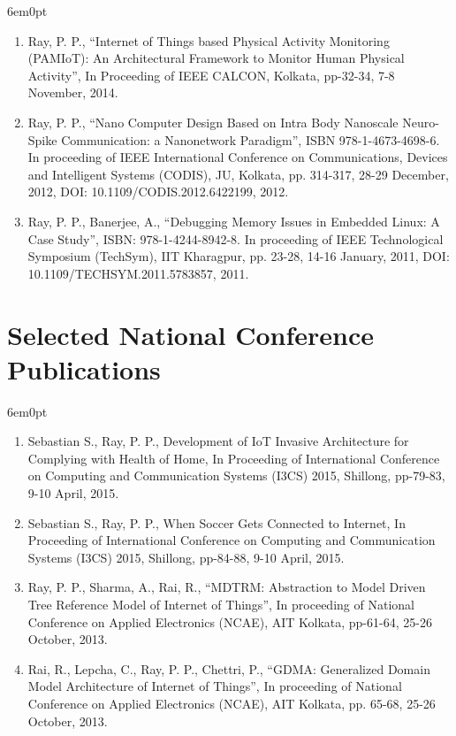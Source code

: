 \documentclass[11pt,a4paper]{moderncv}
\begin{document}
\begin{adjustwidth}{6em}{0pt}
\begin{enumerate}
	\item Ray, P. P., “Internet of Things based Physical Activity Monitoring (PAMIoT): An Architectural Framework to Monitor Human Physical Activity”, In Proceeding of IEEE CALCON, Kolkata, pp-32-34, 7-8 November, 2014.
	
	\item Ray, P. P., “Nano Computer Design Based on Intra Body Nanoscale Neuro-Spike Communication: a Nanonetwork Paradigm”, ISBN 978-1-4673-4698-6. In proceeding of IEEE International Conference on Communications, Devices and Intelligent Systems (CODIS), JU, Kolkata, pp. 314-317, 28-29 December, 2012, DOI: 10.1109/CODIS.2012.6422199, 2012.
	
	\item Ray, P. P., Banerjee, A., “Debugging Memory Issues in Embedded Linux: A Case Study”, ISBN: 978-1-4244-8942-8. In proceeding of IEEE Technological Symposium (TechSym), IIT Kharagpur, pp. 23-28, 14-16 January, 2011, DOI: 10.1109/TECHSYM.2011.5783857, 2011.
	

	\end{enumerate}
\end{adjustwidth}




\section{\textbf{Selected National Conference Publications}}

\begin{adjustwidth}{6em}{0pt}
	\begin{enumerate}
		
		\item Sebastian S., Ray, P. P., Development of IoT Invasive Architecture for Complying with Health of Home, In Proceeding of International Conference on Computing and Communication Systems (I3CS) 2015, Shillong, pp-79-83, 9-10 April, 2015.
		
		\item Sebastian S., Ray, P. P., When Soccer Gets Connected to Internet, In Proceeding of International Conference on Computing and Communication Systems (I3CS) 2015, Shillong, pp-84-88, 9-10 April, 2015.
		
		\item Ray, P. P., Sharma, A., Rai, R., “MDTRM: Abstraction to Model Driven Tree Reference Model of Internet of Things”, In proceeding of National Conference on Applied Electronics (NCAE), AIT Kolkata, pp-61-64, 25-26 October, 2013.
		
		\item Rai, R., Lepcha, C., Ray, P. P., Chettri, P., “GDMA: Generalized Domain Model Architecture of Internet of Things”, In proceeding of National Conference on Applied Electronics (NCAE), AIT Kolkata, pp. 65-68, 25-26 October, 2013.
		
	
	\end{enumerate}
\end{adjustwidth}
\end{document}
